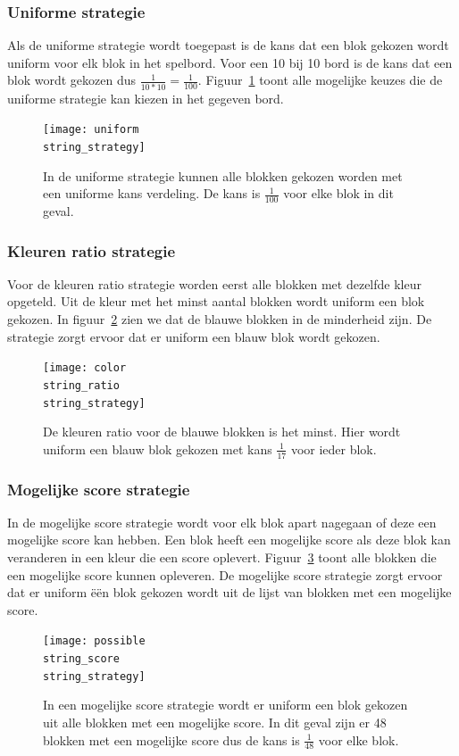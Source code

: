 \documentclass[12pt,a4paper,oneside]{book}
\theoremstyle{definition}
\begin{document}
\subsubsection{Uniforme strategie}
Als de uniforme strategie wordt toegepast is de kans dat een blok gekozen wordt uniform voor elk blok in het spelbord. Voor een 10 bij 10 bord is de kans dat een blok wordt gekozen dus $\frac{1}{10 * 10} = \frac{1}{100}$. Figuur~\ref{figure:uniformStrategy} toont alle mogelijke keuzes die de uniforme strategie kan kiezen in het gegeven bord.
\begin{figure}
	\centering
	\texttt{[image: uniform\\string\_strategy]}
	\caption{In de uniforme strategie kunnen alle blokken gekozen worden met een uniforme kans verdeling. De kans is $\frac{1}{100}$ voor elke blok in dit geval.}
	\label{figure:uniformStrategy}
\end{figure}

\subsubsection{Kleuren ratio strategie}
Voor de kleuren ratio strategie worden eerst alle blokken met dezelfde kleur opgeteld. Uit de kleur met het minst aantal blokken wordt uniform een blok gekozen. In figuur~\ref{figure:colorRatioStrategy} zien we dat de blauwe blokken in de minderheid zijn. De strategie zorgt ervoor dat er uniform een blauw blok wordt gekozen.
\begin{figure}
	\centering
	\texttt{[image: color\\string\_ratio\\string\_strategy]}
	\caption{De kleuren ratio voor de blauwe blokken is het minst. Hier wordt uniform een blauw blok gekozen met kans $\frac{1}{17}$ voor ieder blok.}
	\label{figure:colorRatioStrategy}
\end{figure}

\subsubsection{Mogelijke score strategie}
In de mogelijke score strategie wordt voor elk blok apart nagegaan of deze een mogelijke score kan hebben. Een blok heeft een mogelijke score als deze blok kan veranderen in een kleur die een score oplevert. Figuur~\ref{figure:possibleScoreStrategy} toont alle blokken die een mogelijke score kunnen opleveren. De mogelijke score strategie zorgt ervoor dat er uniform \"{e}\"{e}n blok gekozen wordt uit de lijst van blokken met een mogelijke score.
\begin{figure}
	\centering
	\texttt{[image: possible\\string\_score\\string\_strategy]}
	\caption{In een mogelijke score strategie wordt er uniform een blok gekozen uit alle blokken met een mogelijke score. In dit geval zijn er 48 blokken met een mogelijke score dus de kans is $\frac{1}{48}$ voor elke blok.}
	\label{figure:possibleScoreStrategy}
\end{figure}
\end{document}
